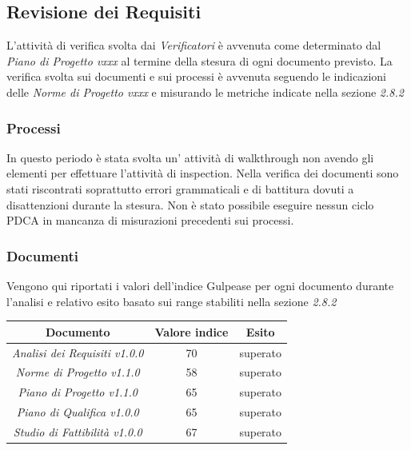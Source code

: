 {\subsection{Revisione dei Requisiti}

L’attività di verifica svolta dai  \emph{Verificatori}  è avvenuta come determinato dal \emph{Piano di Progetto
vxxx} al termine della stesura di ogni documento previsto. La verifica svolta sui documenti e
sui processi è avvenuta seguendo le indicazioni delle  \emph{Norme di Progetto vxxx}  e misurando le
metriche indicate nella sezione \emph{2.8.2}

\subsubsection{Processi}

In questo periodo è stata svolta un' attività di walkthrough non avendo gli elementi
per effettuare l'attività di inspection. Nella verifica dei documenti sono stati riscontrati soprattutto errori grammaticali e di battitura dovuti a disattenzioni durante la stesura.
Non è stato possibile eseguire nessun ciclo PDCA in mancanza di misurazioni precedenti sui processi.

\subsubsection{Documenti}
Vengono qui riportati i valori dell’indice Gulpease per ogni documento durante l’analisi e relativo
esito basato sui range stabiliti nella sezione \emph{2.8.2}
\begin{center}
  \begin{tabular}{|c|c|c|}
    \hline
    \textbf{Documento} & \textbf{Valore indice} & \textbf{Esito} \\
    \hline
    \emph{Analisi dei Requisiti v1.0.0}  & 70 & superato \\
    \hline
    \emph{Norme di Progetto v1.1.0}   & 58  & superato \\
    \hline
    \emph{Piano di Progetto v1.1.0}   & 65 & superato \\
    \hline
    \emph{Piano di Qualifica v1.0.0}   & 65 & superato \\
    \hline
    \emph{Studio di Fattibilità v1.0.0}  & 67 & superato \\
    \hline
  \end{tabular}
  \end{center}

}
